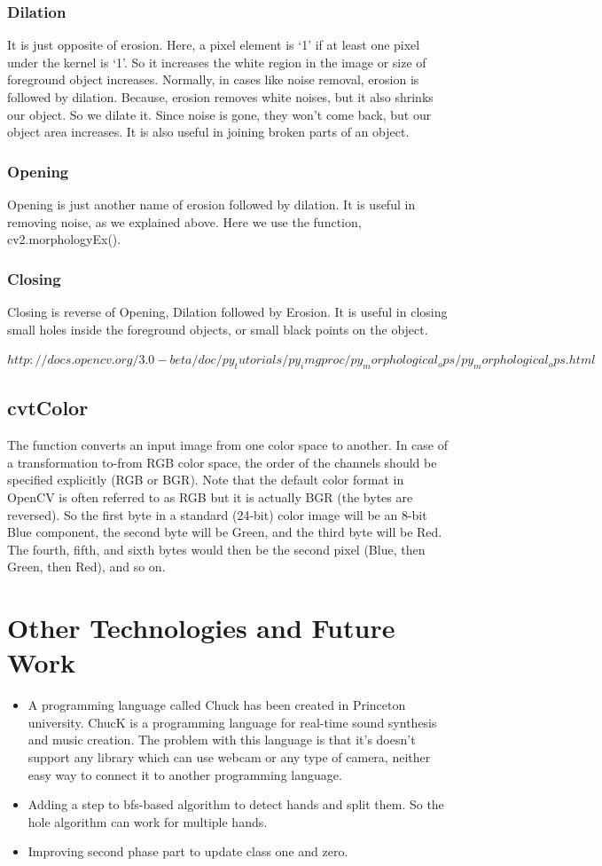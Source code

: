 \subsection{Dilation} \label{ssec:dilation}
It is just opposite of erosion. Here, a pixel element is ‘1’ if at least one pixel under the kernel is ‘1’. So it increases the white region in the image or size of foreground object increases. Normally, in cases like noise removal, erosion is followed by dilation. Because, erosion removes white noises, but it also shrinks our object. So we dilate it. Since noise is gone, they won’t come back, but our object area increases. It is also useful in joining broken parts of an object.
\subsection{Opening}
Opening is just another name of erosion followed by dilation. It is useful in removing noise, as we explained above. Here we use the function, cv2.morphologyEx().
\subsection{Closing}
Closing is reverse of Opening, Dilation followed by Erosion. It is useful in closing small holes inside the foreground objects, or small black points on the object.

\textit{$http://docs.opencv.org/3.0-beta/doc/py_tutorials/py_imgproc/py_morphological_ops/py_morphological_ops.html$}

\section{cvtColor}
The function converts an input image from one color space to another. In case of a transformation to-from RGB color space, the order of the channels should be specified explicitly (RGB or BGR). Note that the default color format in OpenCV is often referred to as RGB but it is actually BGR (the bytes are reversed). So the first byte in a standard (24-bit) color image will be an 8-bit Blue component, the second byte will be Green, and the third byte will be Red. The fourth, fifth, and sixth bytes would then be the second pixel (Blue, then Green, then Red), and so on.

\chapter{Other Technologies and Future Work}
\begin{itemize}
\item{A programming language called Chuck has been created in Princeton university. ChucK is a programming language for real-time sound synthesis and music creation. The problem with this language is that it's doesn't support any library which can use webcam or any type of camera, neither easy way to connect it to another programming language.}
\item{Adding a step to bfs-based algorithm to detect hands and split them. So the hole algorithm can work for multiple hands.}
\item{Improving second phase part to update class one and zero.}
\end{itemize}






